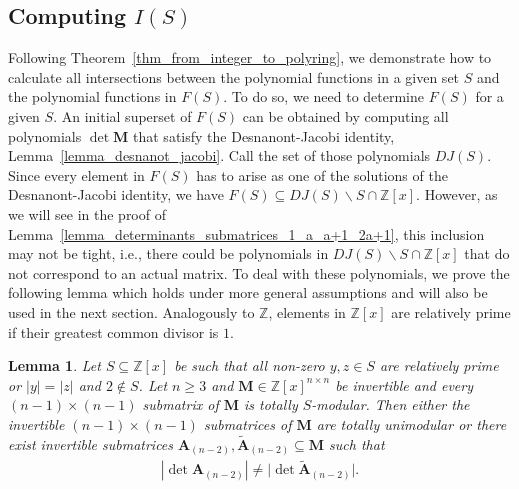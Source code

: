 \documentclass[a4paper, 11pt]{article}
\newcommand{\Z}{\mathbb{Z}}
\newcommand{\bA}{\bm{A}}
\newcommand{\bM}{\bm{M}}
\newcommand{\indet}{x}
\newcommand{\polyring}{\Z[\indet]}
\newcommand{\polyS}{S}
\newcommand{\polyM}{\bM}
\newtheorem{lemma}{Lemma}
\begin{document}
\subsection{Computing $I(\polyS)$}\label{ss_computing_I(S)}
	Following Theorem~\ref{thm_from_integer_to_polyring}, we demonstrate how to calculate all intersections between the polynomial functions in a given set $\polyS$ and the polynomial functions in $F(\polyS)$. To do so, we need to determine $F(\polyS)$ for a given $\polyS$. An initial superset of $F(\polyS)$ can be obtained by computing all polynomials $\det\polyM$ that satisfy the Desnanont-Jacobi identity, Lemma~\ref{lemma_desnanot_jacobi}. Call the set of those polynomials $DJ(\polyS)$. Since every element in $F(\polyS)$ has to arise as one of the solutions of the Desnanont-Jacobi identity, we have $F(\polyS)\subseteq DJ(\polyS)\backslash S \cap \polyring$. However, as we will see in the proof of Lemma~\ref{lemma_determinants_submatrices_1_a_a+1_2a+1}, this inclusion may not be tight, i.e., there could be polynomials in $DJ(\polyS)\backslash S \cap \polyring$ that do not correspond to an actual matrix. 
	To deal with these polynomials, we prove the following lemma which holds under more general assumptions and will also be used in the next section. 
	Analogously to $\Z$, elements in $\polyring$ are relatively prime if their greatest common divisor is $1$.
	\begin{lemma}{\cite[Lemma~6]{celayakuhlmannweismantel2024matricespolynomial}}
	\label{lemma_equal_submatrices_tu}
		Let $\polyS \subseteq\polyring$ be such that all non-zero $y,z\in \polyS$ are relatively prime or $\left|y\right| = \left|z\right|$ and $2\notin \polyS$. Let $n\geq 3$ and $\polyM\in\polyring^{n\times n}$ be invertible and every $(n-1)\times (n-1)$ submatrix of $\polyM$ is totally $\polyS$-modular. Then either the invertible $(n-1)\times (n-1)$ submatrices of $\polyM$ are totally unimodular or there exist invertible submatrices $\bA_{(n-2)},\tilde{\bA}_{(n-2)}\subseteq\bM$ such that
		\begin{align*}
			\left|\det\bA_{(n-2)}\right|\neq\bigl|\det\tilde{\bA}_{(n-2)}\bigr|. 
		\end{align*}
	\end{lemma}
\end{document}
